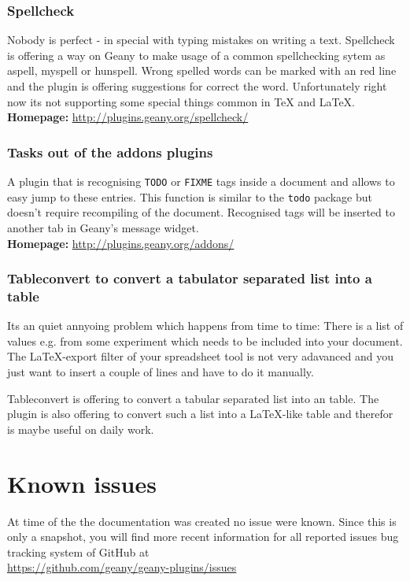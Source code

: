 \documentclass[%
paper=a4,%
fontsize=11pt,%
twoside=false,%
DIV18,%
headsepline,%
plainheadsepline,%
footsepline,%
plainfootsepline,%
bibliography=totoc,%
listof=totoc,%
BCOR10mm,%
parskip=half,%
openany,%
]{scrreprt}
\begin{document}
\subsection{Spellcheck}
Nobody is perfect - in special with typing mistakes on writing a
text. Spellcheck is offering a way on Geany to make usage of a
common spellchecking sytem as aspell, myspell or hunspell. Wrong
spelled words can be marked with an red line and the plugin is
offering suggestions for correct the word. Unfortunately right now
its not supporting some special things common in \TeX{} and \LaTeX{}.\\
\textbf{Homepage:} \url{http://plugins.geany.org/spellcheck/}

\subsection{Tasks out of the addons plugins}
A plugin that is recognising \texttt{TODO} or \texttt{FIXME} tags
inside a document and allows to easy jump to these entries. This
function is similar to the \texttt{todo} package but doesn't require
recompiling of the document. Recognised tags will be inserted to
another tab in Geany's message widget.\\
\textbf{Homepage:} \url{http://plugins.geany.org/addons/}


\subsection{Tableconvert to convert a tabulator separated list into a table}

Its an quiet annyoing problem which happens from time to time: There
is a list of values e.g. from some experiment which needs to be
included into your document. The \LaTeX{}-export filter of your
spreadsheet tool is not very adavanced and you just want to insert a
couple of lines and have to do it manually.

Tableconvert is offering to convert a tabular separated list into an
table. The plugin is also offering to convert such a list into a
\LaTeX{}-like table and therefor is maybe useful on daily work.

\chapter{Known issues}
At time of the the documentation was created no issue were known.
Since this is only a snapshot, you will find more recent information
for all reported issues bug tracking system of GitHub at \\
\url{https://github.com/geany/geany-plugins/issues}
\end{document}
